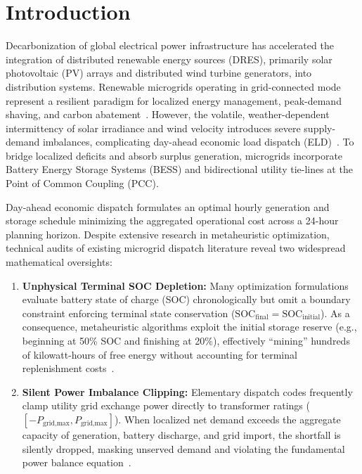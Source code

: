 \documentclass[conference]{IEEEtran}
\begin{document}
\section{Introduction}
Decarbonization of global electrical power infrastructure has accelerated the integration of distributed renewable energy sources (DRES), primarily solar photovoltaic (PV) arrays and distributed wind turbine generators, into distribution systems. Renewable microgrids operating in grid-connected mode represent a resilient paradigm for localized energy management, peak-demand shaving, and carbon abatement~\cite{hatziargyriou2007microgrids}. However, the volatile, weather-dependent intermittency of solar irradiance and wind velocity introduces severe supply-demand imbalances, complicating day-ahead economic load dispatch (ELD)~\cite{olivares2014trends}. To bridge localized deficits and absorb surplus generation, microgrids incorporate Battery Energy Storage Systems (BESS) and bidirectional utility tie-lines at the Point of Common Coupling (PCC).

Day-ahead economic dispatch formulates an optimal hourly generation and storage schedule minimizing the aggregated operational cost across a 24-hour planning horizon. Despite extensive research in metaheuristic optimization, technical audits of existing microgrid dispatch literature reveal two widespread mathematical oversights:
\begin{enumerate}
    \item \textbf{Unphysical Terminal SOC Depletion:} Many optimization formulations evaluate battery state of charge (SOC) chronologically but omit a boundary constraint enforcing terminal state conservation ($\text{SOC}_{\text{final}} = \text{SOC}_{\text{initial}}$). As a consequence, metaheuristic algorithms exploit the initial storage reserve (e.g., beginning at 50\% SOC and finishing at 20\%), effectively ``mining'' hundreds of kilowatt-hours of free energy without accounting for terminal replenishment costs~\cite{chen2021storage}.
    \item \textbf{Silent Power Imbalance Clipping:} Elementary dispatch codes frequently clamp utility grid exchange power directly to transformer ratings ($[-P_{\text{grid,max}}, P_{\text{grid,max}}]$). When localized net demand exceeds the aggregate capacity of generation, battery discharge, and grid import, the shortfall is silently dropped, masking unserved demand and violating the fundamental power balance equation~\cite{parisio2014mpc}.
\end{enumerate}
\end{document}
